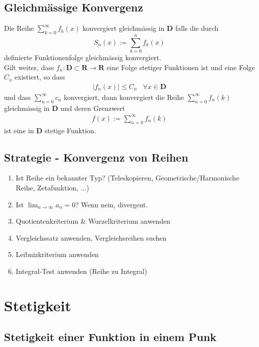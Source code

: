 \documentclass[8pt]{extarticle}
\def\limn{\lim_{n\to \infty}}
\begin{document}
\begin{multicols*}{3}
\subsection{Gleichmässige Konvergenz}

Die Reihe $\sum_{k=0}^\infty f_k(x)$ konvergiert gleichmässig in $\mathbf{D}$ falls die durch
$$
  S_n(x) := \sum_{k=0}^n f_k(x)
$$
definierte Funktionenfolge gleichmässig konvergiert.\\
Gilt weiter, dass $f_n: \mathbf{D} \subset \mathbf{R} \rightarrow \mathbf{R}$ eine Folge
stetiger Funktionen ist und eine Folge $C_n$ existiert, so dass
\begin{align*}
  |f_n(x)| \leq C_n \;\;\; \forall x \in \mathbf{D}
\end{align*}
und dass $\sum_{n = 0}^\infty c_n$ konvergiert, dann konvergiert die Reihe
$\sum_{n = 0}^\infty f_n(k)$ gleichmässig in $\mathbf{D}$ und deren Grenzwert
\begin{align*}
  f(x) := \sum_{n = 0}^\infty f_n(k)
\end{align*}
ist eine in $\mathbf{D}$ stetige Funktion.
\subsection{Strategie - Konvergenz von Reihen}
\begin{enumerate}
 \item Ist Reihe ein bekannter Typ? (Teleskopieren, Geometrische/Harmonische Reihe, Zetafunktion, ...)
 \item Ist $\limn a_n = 0$? Wenn nein, divergent.
 \item Quotientenkriterium \& Wurzelkriterium anwenden
 \item Vergleichssatz anwenden, Vergleichsreihen suchen
 \item Leibnizkriterium anwenden
 \item Integral-Test anwenden (Reihe zu Integral)
\end{enumerate}
\newpage
\section{Stetigkeit}
\hypertarget{sec:2}{}

\subsection{Stetigkeit einer Funktion in einem Punk}


\end{multicols*}
\end{document}
